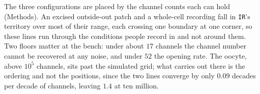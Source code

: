 
The three configurations are placed by the channel counts each can hold (Methods).
An excised outside-out patch and a whole-cell recording fall in \texttt{IR}'s
territory over most of their range, each crossing one boundary at one corner, so these lines run
through the conditions people record in and not around them. Two floors matter at the bench: under
about $17$ channels the channel number cannot be recovered at any noise, and under $52$ the
opening rate. The oocyte, above $10^5$ channels, sits past the simulated grid; what carries out
there is the ordering and not the positions, since the two lines converge by only $0.09$ decades
per decade of channels, leaving $1.4$ at ten million.


